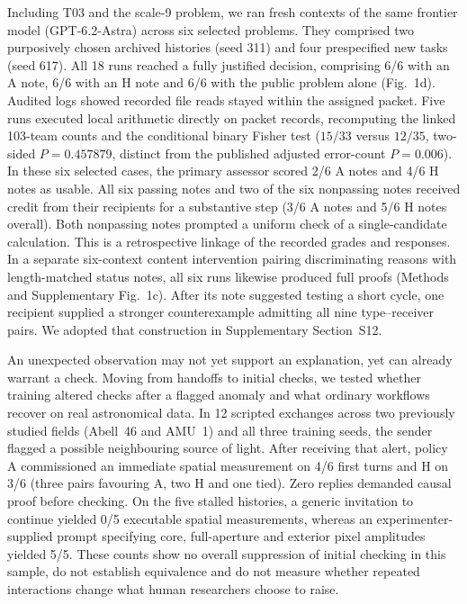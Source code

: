 Including T03 and the scale-9 problem, we ran fresh contexts of the same frontier model (GPT-6.2-Astra) across six selected problems. They comprised two purposively chosen archived histories (seed 311) and four prespecified new tasks (seed 617). All 18 runs reached a fully justified decision, comprising 6/6 with an A note, 6/6 with an H note and 6/6 with the public problem alone (Fig.~1d). Audited logs showed recorded file reads stayed within the assigned packet. Five runs executed local arithmetic directly on packet records, recomputing the linked 103-team counts and the conditional binary Fisher test (\(15/33\) versus \(12/35\), two-sided \(P=0.457879\), distinct from the published adjusted error-count \(P=0.006\)). In these six selected cases, the primary assessor scored 2/6 A notes and 4/6 H notes as usable. All six passing notes and two of the six nonpassing notes received credit from their recipients for a substantive step (3/6 A notes and 5/6 H notes overall). Both nonpassing notes prompted a uniform check of a single-candidate calculation. This is a retrospective linkage of the recorded grades and responses. In a separate six-context content intervention pairing discriminating reasons with length-matched status notes, all six runs likewise produced full proofs (Methods and Supplementary Fig.~1c). After its note suggested testing a short cycle, one recipient supplied a stronger counterexample admitting all nine type--receiver pairs. We adopted that construction in Supplementary Section~S12.

An unexpected observation may not yet support an explanation, yet can already warrant a check. Moving from handoffs to initial checks, we tested whether training altered checks after a flagged anomaly and what ordinary workflows recover on real astronomical data. In 12 scripted exchanges across two previously studied fields (Abell~46 and AMU~1) and all three training seeds, the sender flagged a possible neighbouring source of light. After receiving that alert, policy A commissioned an immediate spatial measurement on 4/6 first turns and H on 3/6 (three pairs favouring A, two H and one tied). Zero replies demanded causal proof before checking. On the five stalled histories, a generic invitation to continue yielded 0/5 executable spatial measurements, whereas an experimenter-supplied prompt specifying core, full-aperture and exterior pixel amplitudes yielded 5/5. These counts show no overall suppression of initial checking in this sample, do not establish equivalence and do not measure whether repeated interactions change what human researchers choose to raise.

